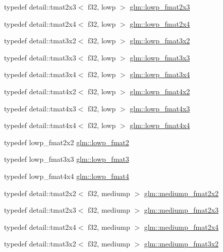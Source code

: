 \begin{CompactItemize}
\item 
typedef detail::tmat2x3$<$ f32, lowp $>$ \hyperlink{group__gtc__type__precision_g01c5c29a6cee22c3e75de25c98dbecc9}{glm::lowp\_\-fmat2x3}
\item 
typedef detail::tmat2x4$<$ f32, lowp $>$ \hyperlink{group__gtc__type__precision_g14b4460b2132fd3db19b53ec6f9353f2}{glm::lowp\_\-fmat2x4}
\item 
typedef detail::tmat3x2$<$ f32, lowp $>$ \hyperlink{group__gtc__type__precision_g6e03c9a11f7d781af7549ce566844cc6}{glm::lowp\_\-fmat3x2}
\item 
typedef detail::tmat3x3$<$ f32, lowp $>$ \hyperlink{group__gtc__type__precision_g25b389b52269f3256f015b4fff5789c2}{glm::lowp\_\-fmat3x3}
\item 
typedef detail::tmat3x4$<$ f32, lowp $>$ \hyperlink{group__gtc__type__precision_g366a3249a72ddc76fb3ee4f2379cf3fb}{glm::lowp\_\-fmat3x4}
\item 
typedef detail::tmat4x2$<$ f32, lowp $>$ \hyperlink{group__gtc__type__precision_g2433f92674e42eb6a75384fbab262306}{glm::lowp\_\-fmat4x2}
\item 
typedef detail::tmat4x3$<$ f32, lowp $>$ \hyperlink{group__gtc__type__precision_ga4df4f3adcc8eb3bed680b14a87fb2c4}{glm::lowp\_\-fmat4x3}
\item 
typedef detail::tmat4x4$<$ f32, lowp $>$ \hyperlink{group__gtc__type__precision_g9ff955b170643f547661d2e7263ee426}{glm::lowp\_\-fmat4x4}
\item 
typedef lowp\_\-fmat2x2 \hyperlink{group__gtc__type__precision_g9bafb192cb7327d543ad55be2e6e675c}{glm::lowp\_\-fmat2}
\item 
typedef lowp\_\-fmat3x3 \hyperlink{group__gtc__type__precision_g88ae00cab6aae48d56700915c7799973}{glm::lowp\_\-fmat3}
\item 
typedef lowp\_\-fmat4x4 \hyperlink{group__gtc__type__precision_g00dfb85ec53bb5f173747f73d13c1b8b}{glm::lowp\_\-fmat4}
\item 
typedef detail::tmat2x2$<$ f32, mediump $>$ \hyperlink{group__gtc__type__precision_ge9af1d96efbaeeb5c5edd9c7b0a24fa5}{glm::mediump\_\-fmat2x2}
\item 
typedef detail::tmat2x3$<$ f32, mediump $>$ \hyperlink{group__gtc__type__precision_gae7081e19f495e7cdbf727e1550b95a8}{glm::mediump\_\-fmat2x3}
\item 
typedef detail::tmat2x4$<$ f32, mediump $>$ \hyperlink{group__gtc__type__precision_g8f793d90a5a6bea23c13ad195fcb5de2}{glm::mediump\_\-fmat2x4}
\item 
typedef detail::tmat3x2$<$ f32, mediump $>$ \hyperlink{group__gtc__type__precision_g40681f25413b8705b16da2f534692f59}{glm::mediump\_\-fmat3x2}

\end{CompactItemize}
